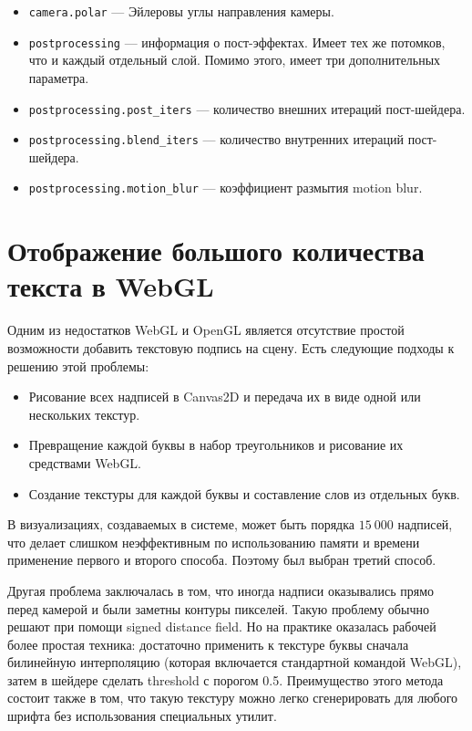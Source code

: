 \begin{itemize}
\item \texttt{camera.polar} --- Эйлеровы углы направления камеры.
\item \texttt{postprocessing} --- информация о пост-эффектах. Имеет тех же потомков, что и каждый отдельный слой. Помимо этого, имеет три дополнительных параметра.
\item \texttt{postprocessing.post\_iters} --- количество внешних итераций пост-шейдера. 
\item \texttt{postprocessing.blend\_iters} --- количество внутренних итераций пост-шейдера.
\item \texttt{postprocessing.motion\_blur} --- коэффициент размытия motion blur.
\end{itemize}

\section{Отображение большого количества текста в WebGL}

Одним из недостатков WebGL и OpenGL является отсутствие простой возможности добавить текстовую подпись на сцену. Есть следующие подходы к решению этой проблемы:

\begin{itemize}
\item Рисование всех надписей в Canvas2D и передача их в виде одной или нескольких текстур.
\item Превращение каждой буквы в набор треугольников и рисование их средствами WebGL.
\item Создание текстуры для каждой буквы и составление слов из отдельных букв.
\end{itemize}

В визуализациях, создаваемых в системе, может быть порядка $15\ 000$ надписей, что делает слишком неэффективным по использованию памяти и времени применение первого и второго способа. Поэтому был выбран третий способ.

Другая проблема заключалась в том, что иногда надписи оказывались прямо перед камерой и были заметны контуры пикселей. Такую проблему обычно решают при помощи signed distance field. Но на практике оказалась рабочей более простая техника: достаточно применить к текстуре буквы сначала билинейную интерполяцию (которая включается стандартной командой WebGL), затем в шейдере сделать threshold с порогом 0.5. Преимущество этого метода состоит также в том, что такую текстуру можно легко сгенерировать для любого шрифта без использования специальных утилит.

